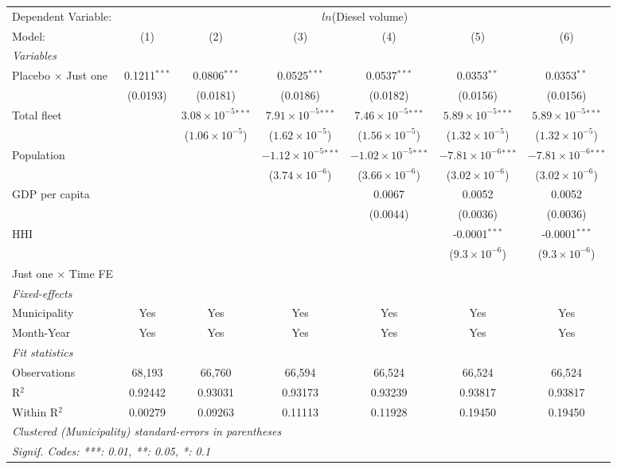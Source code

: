 \documentclass[
]{article}
\begin{document}
\begin{tabular}{lcccccc}
\tabularnewline\midrule\midrule
Dependent Variable:&\multicolumn{6}{c}{$ln$(Diesel volume)}\\
Model:&(1) & (2) & (3) & (4) & (5) & (6)\\
\midrule \emph{Variables}&   &   &   &   &   &  \\
Placebo $\times $ Just one & 0.1211$^{***}$ & 0.0806$^{***}$ & 0.0525$^{***}$ & 0.0537$^{***}$ & 0.0353$^{**}$ & 0.0353$^{**}$\\
  &(0.0193) & (0.0181) & (0.0186) & (0.0182) & (0.0156) & (0.0156)\\
Total fleet &    & $3.08\times 10^{-5}$$^{***}$ & $7.91\times 10^{-5}$$^{***}$ & $7.46\times 10^{-5}$$^{***}$ & $5.89\times 10^{-5}$$^{***}$ & $5.89\times 10^{-5}$$^{***}$\\
  &   & ($1.06\times 10^{-5}$) & ($1.62\times 10^{-5}$) & ($1.56\times 10^{-5}$) & ($1.32\times 10^{-5}$) & ($1.32\times 10^{-5}$)\\
Population &    &    & $-1.12\times 10^{-5}$$^{***}$ & $-1.02\times 10^{-5}$$^{***}$ & $-7.81\times 10^{-6}$$^{***}$ & $-7.81\times 10^{-6}$$^{***}$\\
  &   &    & ($3.74\times 10^{-6}$) & ($3.66\times 10^{-6}$) & ($3.02\times 10^{-6}$) & ($3.02\times 10^{-6}$)\\
GDP per capita &    &    &    & 0.0067 & 0.0052 & 0.0052\\
  &   &    &    & (0.0044) & (0.0036) & (0.0036)\\
HHI &    &    &    &    & -0.0001$^{***}$ & -0.0001$^{***}$\\
  &   &    &    &    & ($9.3\times 10^{-6}$) & ($9.3\times 10^{-6}$)\\
Just one $\times$ Time FE &  &  &  &  &  & \\
\midrule \emph{Fixed-effects}&   &   &   &   &   &  \\
Municipality & Yes & Yes & Yes & Yes & Yes & Yes\\
Month-Year & Yes & Yes & Yes & Yes & Yes & Yes\\
\midrule \emph{Fit statistics}&  & & & & & \\
Observations & 68,193&66,760&66,594&66,524&66,524&66,524\\
R$^2$ & 0.92442&0.93031&0.93173&0.93239&0.93817&0.93817\\
Within R$^2$ & 0.00279&0.09263&0.11113&0.11928&0.19450&0.19450\\
\midrule\midrule\multicolumn{7}{l}{\emph{Clustered (Municipality) standard-errors in parentheses}}\\
\multicolumn{7}{l}{\emph{Signif. Codes: ***: 0.01, **: 0.05, *: 0.1}}\\
\end{tabular}
\end{document}
